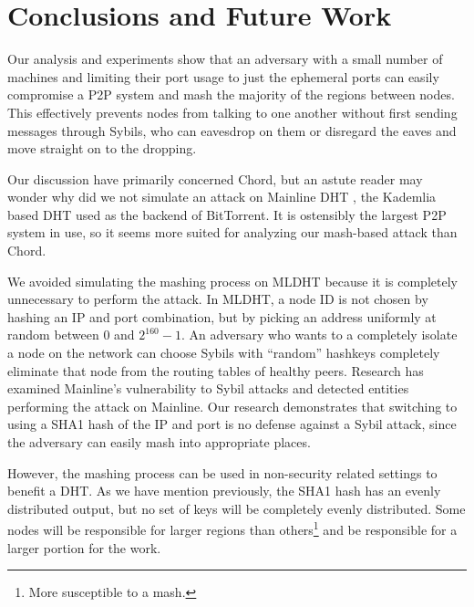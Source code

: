 \documentclass[11pt,conference]{IEEEtran}
\begin{document}



\section{Conclusions and Future Work}
\label{sec:horror}

Our analysis and experiments show that an adversary with a small number of machines and limiting their port usage to just the ephemeral ports can easily compromise a P2P system and mash the majority of the regions between nodes.
This effectively prevents nodes from talking to one another without first sending messages through Sybils, who can eavesdrop on them or disregard the eaves and move straight on to the dropping.

Our discussion have primarily concerned Chord, but an astute reader may wonder why did we not simulate an attack on Mainline DHT  \cite{mainline}, the Kademlia \cite{kademlia} based DHT used as the backend of BitTorrent.
It is ostensibly the largest P2P system in use, so it seems more suited for analyzing our mash-based attack than Chord.

We avoided simulating the mashing process on MLDHT because it is completely unnecessary to perform the attack.
In MLDHT, a node ID is not chosen by hashing an IP and port combination, but by picking an address uniformly at random between 0 and $2^{160}-1$.
An adversary who wants to a completely isolate a node on the network can choose Sybils with ``random'' hashkeys completely eliminate that node from the routing tables of healthy peers. 
Research has examined Mainline's vulnerability to Sybil attacks\cite{sybilbit} and detected entities performing the attack on Mainline.
Our research demonstrates that switching to using a SHA1 hash of the IP and port is no defense against a Sybil attack, since the adversary can easily mash into appropriate places.



However, the mashing process can be used in non-security related settings to benefit a DHT.
As we have mention previously, the SHA1 hash has an evenly distributed output, but no set of keys will be completely evenly distributed.
Some nodes will be responsible for larger regions than others\footnote{More susceptible to a mash.} and be responsible for a larger portion for the work.
\end{document}
